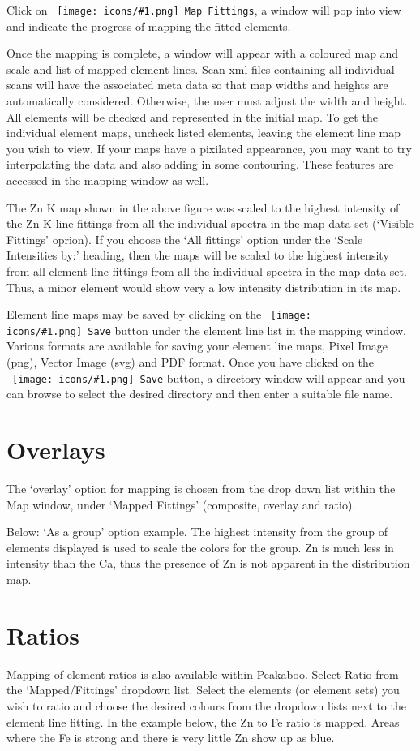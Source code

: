 \documentclass[article,11pt]{report}
\newcommand{\command}[1]{\texttt{#1}}
\newcommand{\icon}[1]{\texttt{[image: icons/\#1.png]}}
\newcommand{\button}[2]{\ \command{\mbox{\icon{#1} #2}}}
\newcommand{\tocsection}[1]{\section*{#1}\addcontentsline{toc}{section}{#1}}
\begin{document}
Click on \button{map}{Map Fittings}, a window will pop into view and indicate the
progress of mapping the fitted elements.

Once the mapping is complete, a window will appear with a coloured map and scale
and list of mapped element lines. Scan xml files containing all individual scans will
have the associated meta data so that map widths and heights are automatically
considered. Otherwise, the user must adjust the width and height. All elements will
be checked and represented in the initial map. To get the individual element maps,
uncheck listed elements, leaving the element line map you wish to view. If your
maps have a pixilated appearance, you may want to try interpolating the data and
also adding in some contouring. These features are accessed in the mapping
window as well.

The Zn K map shown in the above figure was scaled to the highest intensity of the
Zn K line fittings from all the individual spectra in the map data set (‘Visible Fittings’
oprion). If you choose the ‘All fittings’ option under the ‘Scale Intensities by:’
heading, then the maps will be scaled to the highest intensity from all element line
fittings from all the individual spectra in the map data set. Thus, a minor element
would show very a low intensity distribution in its map.

Element line maps may be saved by clicking on the \button{document-save}{Save} button under the
element line list in the mapping window. Various formats are available for saving
your element line maps, Pixel Image (png), Vector Image (svg) and PDF format.
Once you have clicked on the \button{document-save}{Save} button, a directory window will appear and
you can browse to select the desired directory and then enter a suitable file name.

\tocsection{Overlays}

The ‘overlay’ option for mapping is chosen from the drop down list within the Map
window, under ‘Mapped Fittings’ (composite, overlay and ratio).

Below: ‘As a group’ option example. The highest intensity from the group of
elements displayed is used to scale the colors for the group. Zn is much less in
intensity than the Ca, thus the presence of Zn is not apparent in the distribution
map.

\tocsection{Ratios}

Mapping of element ratios is also available within Peakaboo. Select Ratio from the
‘Mapped/Fittings’ dropdown list. Select the elements (or element sets) you wish to
ratio and choose the desired colours from the dropdown lists next to the element
line fitting. In the example below, the Zn to Fe ratio is mapped. Areas where the Fe
is strong and there is very little Zn show up as blue.
\end{document}
